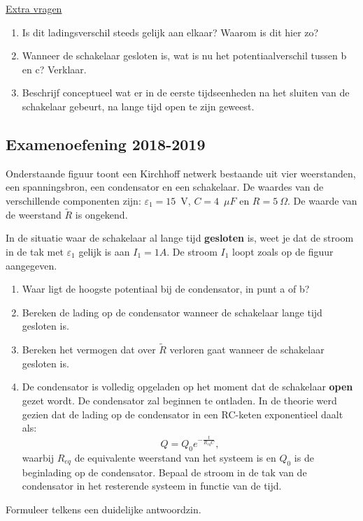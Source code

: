 \underline{Extra vragen}
\begin{enumerate}
\item Is dit ladingsverschil steeds gelijk aan elkaar? Waarom is dit hier zo?
\item Wanneer de schakelaar gesloten is, wat is nu het potentiaalverschil tussen b en c? Verklaar.
\item Beschrijf conceptueel wat er in de eerste tijdseenheden na het sluiten van de schakelaar  gebeurt, na lange tijd open te zijn geweest.
\end{enumerate}



\subsection*{Examenoefening 2018-2019}
	
Onderstaande figuur toont een Kirchhoff netwerk bestaande uit vier weerstanden, een spanningsbron, een condensator en een schakelaar. De waardes van de verschillende componenten zijn: $\varepsilon_1=15$~V, $C=4$~$\mu F$ en $R=5~\Omega$. De waarde van de weerstand $\tilde{R}$ is ongekend. 

In de situatie waar de schakelaar al lange tijd \textbf{gesloten} is, weet je dat de stroom in de tak met $\varepsilon_1$ gelijk is aan $I_1 = 1A$. De stroom $I_1$ loopt zoals op de figuur aangegeven.

\begin{enumerate}
	\item Waar ligt de hoogste potentiaal bij de condensator, in punt a of b?
	\item Bereken de lading op de condensator wanneer de schakelaar lange tijd gesloten is.
	\item Bereken het vermogen dat over $\tilde{R}$ verloren gaat wanneer de schakelaar gesloten is.
	\item De condensator is volledig opgeladen op het moment dat de schakelaar \textbf{open} gezet wordt. De condensator zal beginnen te ontladen. In de theorie werd gezien dat de lading op de condensator in een RC-keten exponentieel daalt als: \[Q=Q_0e^{-\frac{t}{R_{eq}C}},\] waarbij $R_{eq}$ de equivalente weerstand van het systeem is en $Q_0$ is de beginlading op de condensator. Bepaal de stroom in de tak van de condensator in het resterende systeem in functie van de tijd.
\end{enumerate}
Formuleer telkens  een duidelijke antwoordzin. 

\def\x{6}
\def\y{6}
\def\dx{3}
\def\dy{3}

